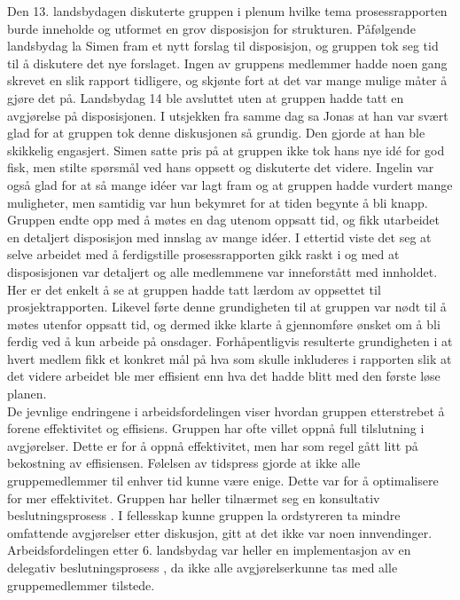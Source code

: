 Den 13. landsbydagen diskuterte gruppen i plenum hvilke tema prosessrapporten burde inneholde og utformet en grov disposisjon for strukturen.
Påfølgende landsbydag la Simen fram et nytt forslag til disposisjon, og gruppen tok seg tid til å diskutere det nye forslaget.
Ingen av gruppens medlemmer hadde noen gang skrevet en slik rapport tidligere, og skjønte fort at det var mange mulige måter å gjøre det på.
Landsbydag 14 ble avsluttet uten at gruppen hadde tatt en avgjørelse på disposisjonen.
I utsjekken fra samme dag sa Jonas at han var svært glad for at gruppen tok denne diskusjonen så grundig.
Den gjorde at han ble skikkelig engasjert.
Simen satte pris på at gruppen ikke tok hans nye id\'{e} for god fisk, men stilte spørsmål ved hans oppsett og diskuterte det videre.
Ingelin var også glad for at så mange id\'{e}er var lagt fram og at gruppen hadde vurdert mange muligheter, men samtidig var hun bekymret for at tiden begynte å bli knapp.
Gruppen endte opp med å møtes en dag utenom oppsatt tid, og fikk utarbeidet en detaljert disposisjon med innslag av mange id\'{e}er.
I ettertid viste det seg at selve arbeidet med å ferdigstille prosessrapporten gikk raskt i og med at disposisjonen var detaljert og alle medlemmene var inneforstått med innholdet.
Her er det enkelt å se at gruppen hadde tatt lærdom av oppsettet til prosjektrapporten.
Likevel førte denne grundigheten til at gruppen var nødt til å møtes utenfor oppsatt tid, og dermed ikke klarte å gjennomføre ønsket om å bli ferdig ved å kun arbeide på onsdager.
Forhåpentligvis resulterte grundigheten i at hvert medlem fikk et konkret mål på hva som skulle inkluderes i rapporten slik at det videre arbeidet ble mer effisient enn hva det hadde blitt med den første løse planen.\\

De jevnlige endringene i arbeidsfordelingen viser hvordan gruppen etterstrebet å forene effektivitet og effisiens.
Gruppen har ofte villet oppnå full tilslutning i avgjørelser.
Dette er for å oppnå effektivitet, men har som regel gått litt på bekostning av effisiensen.
Følelsen av tidspress gjorde at ikke alle gruppemedlemmer til enhver tid kunne være enige.
Dette var for å optimalisere for mer effektivitet.
Gruppen har heller tilnærmet seg en konsultativ beslutningsprosess \cite{schwarz}.
I fellesskap kunne gruppen la ordstyreren ta mindre omfattende avgjørelser etter diskusjon, gitt at det ikke var noen innvendinger.
Arbeidsfordelingen etter 6. landsbydag var heller en implementasjon av en delegativ beslutningsprosess \cite{schwarz}, da ikke alle avgjørelserkunne tas med alle gruppemedlemmer tilstede.\\

